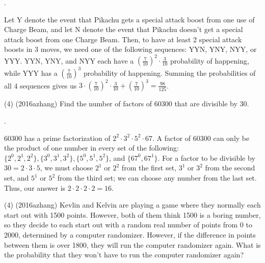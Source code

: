 \documentclass[11pt]{article}
\begin{document}
\begin{answer}
.
\end{answer}

\begin{solution}
Let Y denote the event that Pikachu gets a special attack boost from one use of Charge Beam, and let N denote the event that Pikachu doesn't get a special attack boost from one Charge Beam. Then, to have at least 2 special attack boosts in 3 moves, we need one of the following sequences: YYN, YNY, NYY, or YYY. YYN, YNY, and NYY each have a $(\frac{7}{10})^2\cdot\frac{3}{10}$ probability of happening, while YYY has a $(\frac{7}{10})^3$ probability of happening. Summing the probabilities of all 4 sequences gives us $3\cdot(\frac{7}{10})^2\cdot\frac{3}{10} + (\frac{7}{10})^3 = \boxed{\frac{98}{125}}$.
\end{solution}

\begin{problem}
(4) (2016azhang) Find the number of factors of 60300 that are divisible by 30.
\end{problem}

\begin{answer}
.
\end{answer}

\begin{solution}
60300 has a prime factorization of $2^2\cdot3^2\cdot5^2\cdot67$. A factor of 60300 can only be the product of one number in every set of the following: $\{2^0, 2^1, 2^2\}, \{3^0, 3^1, 3^2\}, \{5^0, 5^1, 5^2\}$, and $\{67^0, 67^1\}$. For a factor to be divisible by $30 = 2\cdot3\cdot5$, we must choose $2^1$ or $2^2$ from the first set, $3^1$ or $3^2$ from the second set, and $5^1$ or $5^2$ from the third set; we can choose any number from the last set. Thus, our answer is $2\cdot2\cdot2\cdot2 = 16$.
\end{solution}

\begin{problem}
(4) (2016azhang) Kevlin and Kelvin are playing a game where they normally each start out with 1500 points. However, both of them think 1500 is a boring number, so they decide to each start out with a random real number of points from 0 to 2000, determined by a computer randomizer. However, if the difference in points between them is over 1800, they will run the computer randomizer again. What is the probability that they won't have to run the computer randomizer again? 
\end{problem}
\end{document}
